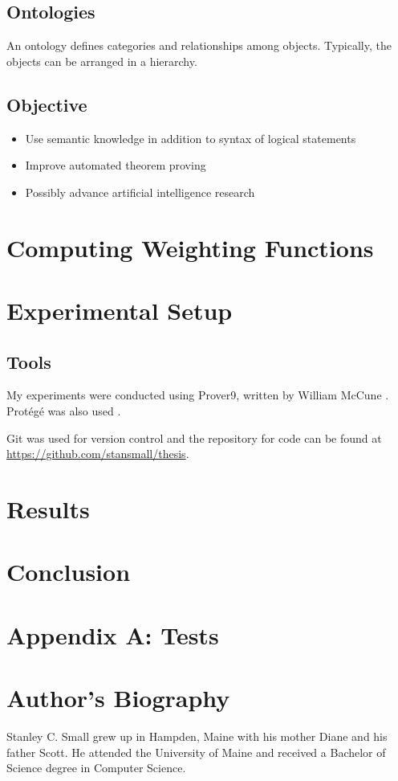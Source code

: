 \documentclass{article}
\begin{document}
	\subsection{Ontologies}
		An ontology defines categories and relationships among objects. Typically, the objects can be arranged in a hierarchy. 

	
	\subsection{Objective}
		\begin{itemize}
		    \item Use semantic knowledge in addition to syntax of logical statements
		    \item Improve automated theorem proving
		    \item Possibly advance artificial intelligence research
		\end{itemize}
	
\section{Computing Weighting Functions}

\section{Experimental Setup}
\subsection{Tools}
My experiments were conducted using Prover9, written by William McCune \cite{mccune2005prover9}. Prot{\'e}g{\'e} was also used \cite{gennari2003evolution}.

Git was used for version control and the repository for code can be found at \url{https://github.com/stansmall/thesis}.

\section{Results}

\section{Conclusion}

\nocite{*}
\newpage
\printbibliography
\newpage
\section{Appendix A: Tests}
\newpage
\section{Author's Biography}
Stanley C. Small grew up in Hampden, Maine with his mother Diane and his father Scott. He attended the University of Maine and received a Bachelor of Science degree in Computer Science. 
\end{document}
